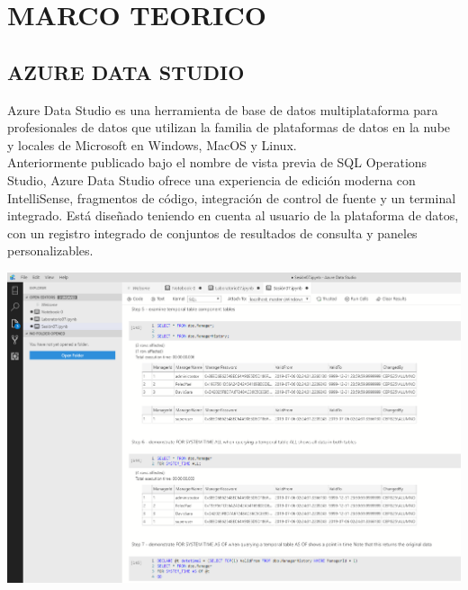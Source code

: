 \section{MARCO TEORICO} 

\subsection{AZURE DATA STUDIO }
Azure Data Studio es una herramienta de base de datos multiplataforma para profesionales de datos que utilizan la familia de plataformas de datos en la nube y locales de Microsoft en Windows, MacOS y Linux.
\\Anteriormente publicado bajo el nombre de vista previa de SQL Operations Studio, Azure Data Studio ofrece una experiencia de edición moderna con IntelliSense, fragmentos de código, integración de control de fuente y un terminal integrado. Está diseñado teniendo en cuenta al usuario de la plataforma de datos, con un registro integrado de conjuntos de resultados de consulta y paneles personalizables.

\begin{center}
		\includegraphics[width=15cm]{./Imagenes/1}
		\end{center}

